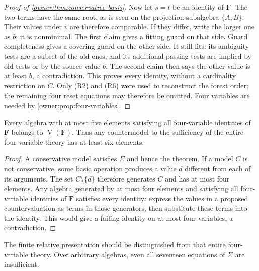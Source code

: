 \begin{proof}[Proof of \cref{owner:thm:conservative-basis}]
Now let $s=t$ be an identity of $\mathbf F$. The two terms have
the same root, as is seen on the projection subalgebra $\{A,B\}$.
Their values under $v$ are therefore comparable. If they differ,
write the larger one as $b$; it is nonminimal. The first claim gives
a fitting guard on that side. Guard completeness gives a covering
guard on the other side. It still fits: its ambiguity tests are a
subset of the old ones, and its additional passing tests are implied
by old tests or by the source value $b$. The second claim then says
the other value is at least $b$, a contradiction. This proves every
identity, without a cardinality restriction on $C$.
Only (R2) and (R6) were used to reconstruct the forest order; the
remaining four reset equations may therefore be omitted. Four variables
are needed by \cref{owner:prop:four-variables}.
\end{proof}

\begin{corollary}
\label{owner:cor:small-four-variable}
Every algebra with at most five elements satisfying all four-variable
identities of $\mathbf F$ belongs to $\operatorname V(\mathbf F)$.
Thus any countermodel to the sufficiency of the entire four-variable
theory has at least six elements.
\end{corollary}
\begin{proof}
A conservative model satisfies $\Sigma$ and hence the theorem.
If a model $C$ is not conservative, some basic operation produces a
value $d$ different from each of its arguments. The set
$C\setminus\{d\}$ therefore generates $C$ and has at most four
elements. Any algebra generated by at most four elements and satisfying
all four-variable identities of $\mathbf F$ satisfies every identity:
express the values in a proposed countervaluation as terms in those
generators, then substitute these terms into the identity. This would
give a failing identity on at most four variables, a contradiction.
\end{proof}

The finite relative presentation should be distinguished from that
entire four-variable theory. Over arbitrary algebras, even all
seventeen equations of $\Sigma$ are insufficient.

